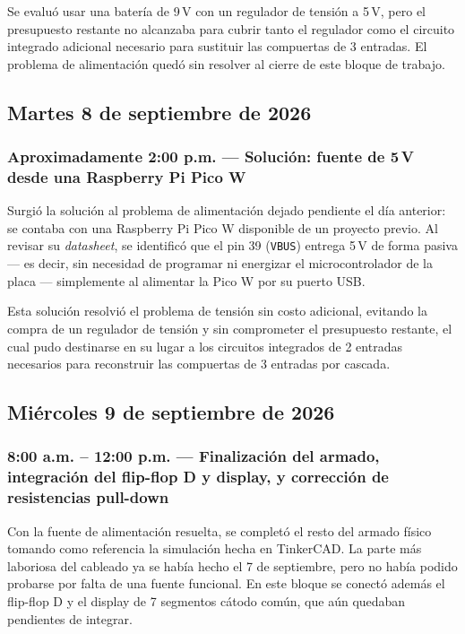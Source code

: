 \documentclass[11pt]{article}
\begin{document}
Se evaluó usar una batería de 9\,V con un regulador de tensión a 5\,V,
pero el presupuesto restante no alcanzaba para cubrir tanto el regulador
como el circuito integrado adicional necesario para sustituir las
compuertas de 3 entradas. El problema de alimentación quedó sin resolver
al cierre de este bloque de trabajo.

\subsection{Martes 8 de septiembre de 2026}

\subsubsection{Aproximadamente 2:00 p.m. --- Solución: fuente de 5\,V
desde una Raspberry Pi Pico W}

Surgió la solución al problema de alimentación dejado pendiente el día
anterior: se contaba con una Raspberry Pi Pico W disponible de un
proyecto previo. Al revisar su \emph{datasheet}, se identificó que el
pin 39 (\texttt{VBUS}) entrega 5\,V de forma pasiva --- es decir, sin
necesidad de programar ni energizar el microcontrolador de la placa ---
simplemente al alimentar la Pico W por su puerto USB.

Esta solución resolvió el problema de tensión sin costo adicional,
evitando la compra de un regulador de tensión y sin comprometer el
presupuesto restante, el cual pudo destinarse en su lugar a los
circuitos integrados de 2 entradas necesarios para reconstruir las
compuertas de 3 entradas por cascada.

\subsection{Miércoles 9 de septiembre de 2026}

\subsubsection{8:00 a.m. -- 12:00 p.m. --- Finalización del armado,
integración del flip-flop D y display, y corrección de resistencias
pull-down}

Con la fuente de alimentación resuelta, se completó el resto del armado
físico tomando como referencia la simulación hecha en TinkerCAD. La
parte más laboriosa del cableado ya se había hecho el 7 de septiembre,
pero no había podido probarse por falta de una fuente funcional. En este
bloque se conectó además el flip-flop D y el display de 7 segmentos
cátodo común, que aún quedaban pendientes de integrar.
\end{document}
